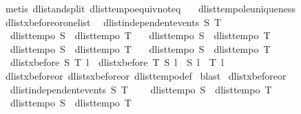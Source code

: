 \begin{isabellebody}
\isamarkupfalse%
\ {\isacharparenleft}metis\ dlist{\isacharunderscore}and{\isacharunderscore}split{}\ dlist{\isacharunderscore}tempo{\isacharunderscore}equiv{\isacharunderscore}not{\isacharunderscore}eq\ \isanewline
\ \ dlist{\isacharunderscore}tempo{}{\isacharunderscore}le{\isacharunderscore}uniqueness{\isacharparenright}%
\endisatagproof
{\isafoldproof}%
%
\isadelimproof
\isanewline
%
\endisadelimproof
\isanewline
{}\isamarkupfalse%
\ dlist{\isacharunderscore}xbefore{\isacharunderscore}or{\isacharunderscore}one{\isacharunderscore}list{\isacharcolon}\isanewline
\ \ {\isachardoublequoteopen}dlist{\isacharunderscore}independent{\isacharunderscore}events\ S\ T\ {\isasymLongrightarrow}\ \isanewline
\ \ dlist{\isacharunderscore}tempo{}\ S\ {\isasymLongrightarrow}\ dlist{\isacharunderscore}tempo{}\ T\ {\isasymLongrightarrow}\isanewline
\ \ dlist{\isacharunderscore}tempo{}\ S\ {\isasymLongrightarrow}\ dlist{\isacharunderscore}tempo{}\ T\ {\isasymLongrightarrow}\isanewline
\ \ dlist{\isacharunderscore}tempo{}\ S\ {\isasymLongrightarrow}\ dlist{\isacharunderscore}tempo{}\ T\ {\isasymLongrightarrow}\isanewline
\ \ dlist{\isacharunderscore}tempo{}\ S\ {\isasymLongrightarrow}\ dlist{\isacharunderscore}tempo{}\ T\ {\isasymLongrightarrow}\isanewline
\ \ dlist{\isacharunderscore}xbefore\ S\ T\ l\ {\isasymor}\ dlist{\isacharunderscore}xbefore\ T\ S\ l\ {\isasymlongleftrightarrow}\ S\ l\ {\isasymand}\ T\ l{\isachardoublequoteclose}\isanewline
%
\isadelimproof
%
\endisadelimproof
%
\isatagproof
{}\isamarkupfalse%
\ dlist{\isacharunderscore}xbefore{\isacharunderscore}or{}\ dlists{\isacharunderscore}xbefore{\isacharunderscore}or{}\ dlist{\isacharunderscore}tempo{\isacharunderscore}def\isanewline
{}\isamarkupfalse%
\ blast%
\endisatagproof
{\isafoldproof}%
%
\isadelimproof
\isanewline
%
\endisadelimproof
\isanewline
{}\isamarkupfalse%
\ dlist{\isacharunderscore}xbefore{\isacharunderscore}or{\isacharcolon}\ \isanewline
\ \ {\isachardoublequoteopen}dlist{\isacharunderscore}independent{\isacharunderscore}events\ S\ T\ {\isasymLongrightarrow}\ \isanewline
\ \ dlist{\isacharunderscore}tempo{}\ S\ {\isasymLongrightarrow}\ dlist{\isacharunderscore}tempo{}\ T\ {\isasymLongrightarrow}\isanewline
\ \ dlist{\isacharunderscore}tempo{}\ S\ {\isasymLongrightarrow}\ dlist{\isacharunderscore}tempo{}\ T\ {\isasymLongrightarrow}\isanewline

\end{isabellebody}
